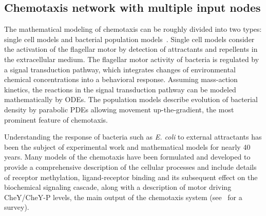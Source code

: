 \documentclass[pdflatex,sn-basic,Numbered]{sn-jnl}
\theoremstyle{thmstyleone}%
\numberwithin{equation}{section}
\begin{document}
\subsection{Chemotaxis network with multiple input nodes}\label{sec:chemotaxis}

The mathematical modeling of chemotaxis can be roughly divided into two types: single cell models and bacterial population models~\cite{tindall08a,tindall08b}.
Single cell models consider the activation of the flagellar motor by detection of attractants and repellents in the extracellular medium. 
The flagellar motor activity of bacteria is regulated by a signal transduction pathway, which integrates changes of environmental chemical concentrations into a behavioral response. 
Assuming mass-action kinetics, the reactions in the signal transduction pathway can be modeled mathematically by ODEs. 
The population models describe evolution of bacterial density by parabolic PDEs allowing movement up-the-gradient, the most prominent feature of chemotaxis. 

Understanding the response of bacteria such as \textit{E. coli} to external attractants has been the subject of experimental work and mathematical models for nearly 40 years. 
Many models of the chemotaxis have been formulated and developed to provide a comprehensive description of the cellular processes and include details of receptor methylation, ligand-receptor binding and its subsequent effect on the biochemical signaling cascade, along with a description of motor driving CheY/CheY-P levels, the main output of the chemotaxis system  (see~\cite{tindall08a} for a survey).
\end{document}
